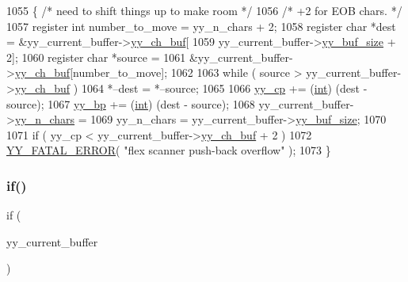 \begin{DoxyCode}
1055                 \{ \textcolor{comment}{/* need to shift things up to make room */}
1056                 \textcolor{comment}{/* +2 for EOB chars. */}
1057                 \textcolor{keyword}{register} \textcolor{keywordtype}{int} number\_to\_move = yy\_n\_chars + 2;
1058                 \textcolor{keyword}{register} \textcolor{keywordtype}{char} *dest = &yy\_current\_buffer->\mbox{\hyperlink{structyy__buffer__state_ad7b8df8d8a4688e57b0b8d3ca75adc85}{yy\_ch\_buf}}[
1059                                         yy\_current\_buffer->\mbox{\hyperlink{structyy__buffer__state_a48302f5f3477a9c78bbddf56d356ef54}{yy\_buf\_size}} + 2];
1060                 \textcolor{keyword}{register} \textcolor{keywordtype}{char} *source =
1061                                 &yy\_current\_buffer->\mbox{\hyperlink{structyy__buffer__state_ad7b8df8d8a4688e57b0b8d3ca75adc85}{yy\_ch\_buf}}[number\_to\_move];
1062 
1063                 \textcolor{keywordflow}{while} ( source > yy\_current\_buffer->\mbox{\hyperlink{structyy__buffer__state_ad7b8df8d8a4688e57b0b8d3ca75adc85}{yy\_ch\_buf}} )
1064                         *--dest = *--source;
1065 
1066                 \mbox{\hyperlink{expr-lex_8cpp_aebf8322d98e81db5af081bb22a5f06fe}{yy\_cp}} += (\mbox{\hyperlink{_util_8cpp_a0ef32aa8672df19503a49fab2d0c8071}{int}}) (dest - source);
1067                 \mbox{\hyperlink{expr-lex_8cpp_a71cf769ce518e8687bf8999b278c65f4}{yy\_bp}} += (\mbox{\hyperlink{_util_8cpp_a0ef32aa8672df19503a49fab2d0c8071}{int}}) (dest - source);
1068                 yy\_current\_buffer->\mbox{\hyperlink{structyy__buffer__state_a06406208824817acfec2183b79080945}{yy\_n\_chars}} =
1069                         yy\_n\_chars = yy\_current\_buffer->\mbox{\hyperlink{structyy__buffer__state_a48302f5f3477a9c78bbddf56d356ef54}{yy\_buf\_size}};
1070 
1071                 \textcolor{keywordflow}{if} ( yy\_cp < yy\_current\_buffer->\mbox{\hyperlink{expr-lex_8cpp_a49f3339224f2ff52f9191b351b184dbd}{yy\_ch\_buf}} + 2 )
1072                         \mbox{\hyperlink{expr-lex_8cpp_ac0586b8b0b092d02f4ba7d45abe328f2}{YY\_FATAL\_ERROR}}( \textcolor{stringliteral}{"flex scanner push-back overflow"} );
1073                 \}
\end{DoxyCode}
\mbox{\label{expr-lex_8cpp_a287b9b5ee695381a7c406c22383cba19}} 
\subsubsection{\texorpdfstring{if()}{if()}\hspace{0.1cm}{\footnotesize\ttfamily [4/9]}}
{\footnotesize\ttfamily if (\begin{DoxyParamCaption}\item[{yy\+\_\+current\+\_\+buffer}]{ }\end{DoxyParamCaption})}



